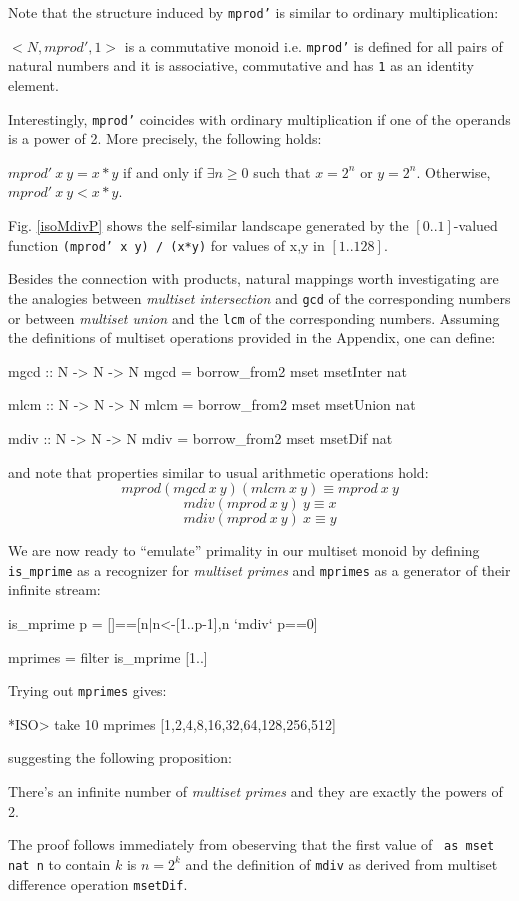\documentclass[]{INCLUDES/llncs}
\begin{document}
Note that the structure induced by {\tt mprod'} is similar to ordinary
multiplication:
\begin{prop}
$<N,mprod',1>$ is a commutative monoid i.e. {\tt mprod'} is defined for all pairs of
natural numbers and it is associative, commutative
and has {\tt 1} as an identity element.
\end{prop}
Interestingly, {\tt mprod'} coincides with ordinary multiplication if one of the
operands is a power of 2. More precisely, the following holds:
\begin{prop}
$mprod'~x~y = x * y$ if and only if 
$\exists n \geq 0$ such that $x=2^n$ or $y=2^n$.
Otherwise, $mprod'~x~y <  x * y$.
\end{prop}
Fig. \ref{isoMdivP} shows the self-similar landscape
generated by the $[0..1]$-valued function {\tt (mprod' x y) / (x*y)}
for values of x,y in $[1..128]$.

Besides the connection with products, natural mappings worth investigating are
the analogies between {\em multiset intersection} and {\tt gcd} of the
corresponding numbers or between {\em multiset
union} and the {\tt lcm} of the corresponding numbers. Assuming the
definitions of multiset operations provided in the Appendix, one can define:

\begin{code}
mgcd :: N -> N -> N
mgcd = borrow_from2 mset msetInter nat

mlcm :: N -> N -> N
mlcm = borrow_from2 mset msetUnion nat

mdiv :: N -> N -> N
mdiv = borrow_from2 mset msetDif nat
\end{code}
and note that properties similar to usual arithmetic operations hold:
\begin{equation}
mprod (mgcd~x~y) (mlcm~x~y)  \equiv mprod~x~y
\end{equation}
\begin{equation}
mdiv (mprod~x~y)~y \equiv x
\end{equation}
\begin{equation}
mdiv (mprod~x~y)~x \equiv y
\end{equation}

We are now ready to ``emulate'' primality in our multiset monoid by defining
{\tt is\_mprime} as a recognizer for {\em multiset primes} and {\tt mprimes} as
a generator of their infinite stream:
\begin{code}
is_mprime p = []==[n|n<-[1..p-1],n `mdiv` p==0]

mprimes = filter is_mprime [1..]
\end{code}
Trying out {\tt mprimes} gives:
\begin{codex}
*ISO> take 10 mprimes
[1,2,4,8,16,32,64,128,256,512]
\end{codex}
suggesting the following proposition:
\begin{prop}
There's an infinite number of {\em multiset primes} and they are exactly the
powers of 2.
\end{prop}
The proof follows immediately from obeserving that the first value of {\tt
as mset nat n} to contain $k$ is $n=2^k$ and the definition of {\tt mdiv} as
derived from multiset difference operation {\tt msetDif}.
\end{document}

